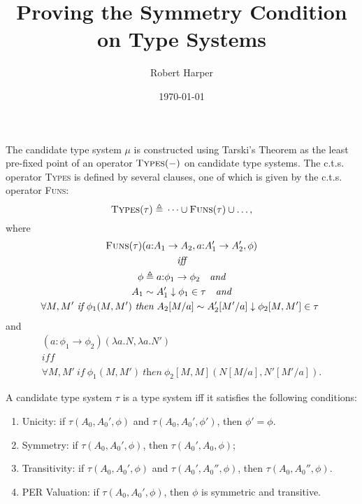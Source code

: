 \documentclass[11pt,twoside]{article}
\newcommand{\eqdef}{\mathrel{\triangleq}}
\newcommand{\DFun}[3]{{#2}{:}{#1}\to{#3}}
\begin{document}
\title{Proving the Symmetry Condition on Type Systems}
\author{Robert Harper}
\date{\today}

\maketitle{}

The candidate type system $\mu$ is constructed using Tarski's Theorem as the least pre-fixed
point of an operator $\textsc{Types}(-)$ on candidate type systems.  The c.t.s. operator
\textsc{Types} is defined by several clauses, one of which is given by the c.t.s. operator
\textsc{Funs}:
\begin{displaymath}
  \textsc{Types}(\tau) \eqdef{} \dots \cup \textsc{Funs}(\tau) \cup \dots,
\end{displaymath}
where
\begin{gather}
  \textsc{Funs}(\tau)(\DFun{A_{1}}{a}{A_{2}},\DFun{A_{1}'}{a}{A_{2}'},\phi) \\
  \textit{iff} \\
  \phi\eqdef{} \DFun{\phi_{1}}{a}{\phi_{2}}\quad\textit{and} \\
  A_{1}\sim A_{1}'\downarrow\phi_{1}\in\tau \quad\textit{and}\\
  \forall M,M'\ \textit{if}\ \phi_{1}(M,M')\ \textit{then}\ A_{2}[M/a]\sim A_{2}'[M'/a]\downarrow\phi_{2}[M,M']\in\tau \
\end{gather}
and
\begin{gather}
  (\DFun{\phi_{1}}{a}{\phi_{2}})(\lambda a.N,\lambda a.N')\\
  \textit{iff}\  \\
  \forall M,M'\ \textit{if}\ \phi_{1}(M,M')\ \textit{then}\ \phi_{2}[M,M](N[M/a],N'[M'/a]).
\end{gather}

\bigskip

A candidate type system $\tau$ is a type system iff it satisfies the following conditions:
\begin{enumerate}
\item Unicity: if $\tau(A_{0},A_{0}',\phi)$ and $\tau(A_{0},A_{0}',\phi')$, then $\phi'=\phi$.
\item Symmetry: if $\tau(A_{0},A_{0}',\phi)$, then $\tau(A_{0}',A_{0},\phi)$;
\item Transitivity: if $\tau(A_{0},A_{0}',\phi)$ and $\tau(A_{0}',A_{0}'',\phi)$, then
  $\tau(A_{0},A_{0}'',\phi)$.
\item PER Valuation: if $\tau(A_{0},A_{0}',\phi)$, then $\phi$ is symmetric and transitive.
\end{enumerate}
\end{document}
